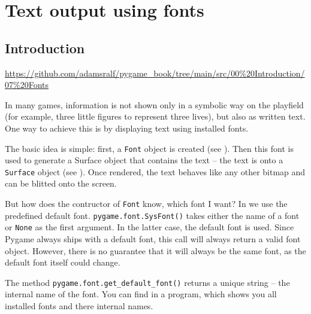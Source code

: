 \newpage
\section{Text output using fonts}
\subsection{Introduction}
\begin{diskbox}
	\url{https://github.com/adamsralf/pygame_book/tree/main/src/00%20Introduction/07%20Fonts}
\end{diskbox}


In many games, information is not shown only in a symbolic way on the playfield (for example, three little figures to represent three lives), but also as written text. One way to achieve this is by displaying text using installed fonts.

The basic idea is simple: first, a \texttt{Font} object is created (see ). Then this font is used to generate a Surface object that contains the text -- the text is  onto a \texttt{Surface} object (see ). Once rendered, the text behaves like any other bitmap and can be blitted onto the screen.


But how does the contructor of \texttt{Font} know, which font I want? In  we use the predefined default font. \texttt{pygame.font.SysFont()} 
takes either the name of a font or \texttt{None} as the first argument. In the latter case, the default font is used. Since Pygame always ships with a default font, this call will always return a valid font object. However, there is no guarantee that it will always be the same font, as the default font itself could change.

The method \texttt{pygame.font.get\_default\_font()} returns a unique string -- the internal name of the font. You can find in  a program, which shows you all installed fonts and there internal names.

